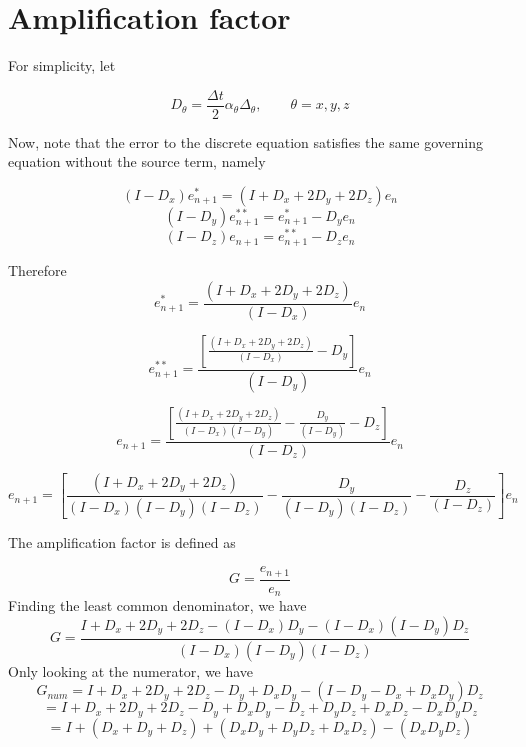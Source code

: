 \documentclass[11pt]{article}
\begin{document}
\section{Amplification factor}

For simplicity, let

\begin{equation}
	D_{\theta} = \frac{\Delta t}{2} \alpha_{\theta} \Delta_{\theta}, \qquad \theta = x,y,z
\end{equation}

Now, note that the error to the discrete equation satisfies the same governing equation without the source term, namely

\begin{equation}
	(I-D_x)e_{n+1}^* = (I+D_x+2D_y+2D_z)e_n
\end{equation}
\begin{equation}
	(I-D_y)e_{n+1}^{**} = e_{n+1}^* - D_ye_n
\end{equation}
\begin{equation}
	(I-D_z)e_{n+1} = e_{n+1}^{**} - D_z e_n
\end{equation}

Therefore
\begin{equation}
	e_{n+1}^{*} =
	\frac{(I+D_x+2D_y+2D_z)}{(I-D_x)}e_n
\end{equation}

\begin{equation}
	e_{n+1}^{**} =
	\frac{
	\left[
	\frac{(I+D_x+2D_y+2D_z)}{(I-D_x)}-D_y
	\right]
	}{(I-D_y)}e_n
\end{equation}

\begin{equation}
	e_{n+1} =
	\frac{
	\left[
	\frac{(I+D_x+2D_y+2D_z)}{(I-D_x)(I-D_y)}
	-
	\frac{D_y}{(I-D_y)}
	-
	D_z
	\right]
	}{(I-D_z)}e_n
\end{equation}

\begin{equation}
	e_{n+1} =
	\left[
	\frac{(I+D_x+2D_y+2D_z)}{(I-D_x)(I-D_y)(I-D_z)}
	-
	\frac{D_y}{(I-D_y)(I-D_z)}
	-
	\frac{D_z}{(I-D_z)}
	\right]
	e_n
\end{equation}

The amplification factor is defined as

\begin{equation}
	G = \frac{e_{n+1}}{e_{n}}
\end{equation}
Finding the least common denominator, we have
\begin{equation}
	G =
	\frac{I+D_x+2D_y+2D_z - (I-D_x)D_y - (I-D_x)(I-D_y)D_z}{(I-D_x)(I-D_y)(I-D_z)}
\end{equation}
Only looking at the numerator, we have
\begin{equation}
	G_{num} = I+D_x+2D_y+2D_z-D_y+D_x D_y - (I-D_y-D_x+D_xD_y)D_z
\end{equation}
\begin{equation}
	= I+D_x+2D_y+2D_z-D_y+D_x D_y - D_z +D_yD_z +D_xD_z - D_xD_yD_z
\end{equation}
\begin{equation}
	= I+(D_x+D_y+D_z)+(D_xD_y+D_yD_z+D_xD_z)-(D_xD_yD_z)
\end{equation}
\end{document}
